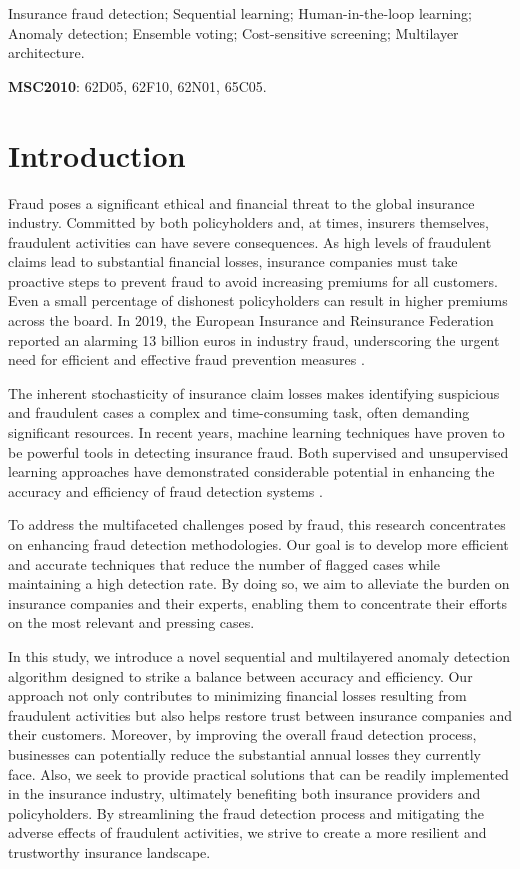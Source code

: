 \documentclass[12pt]{article}
\begin{document}
 Insurance fraud detection; Sequential learning;
Human-in-the-loop learning; Anomaly detection; Ensemble voting;
Cost-sensitive screening; Multilayer architecture.

{\bf MSC2010}: {62D05, 62F10, 62N01, 65C05.}

\section{Introduction}

Fraud poses a significant ethical and financial threat to the
global insurance industry. Committed by both policyholders and, at
times, insurers themselves, fraudulent activities can have severe
consequences. As high levels of fraudulent claims lead to
substantial financial losses, insurance companies must take
proactive steps to prevent fraud to avoid increasing premiums for
all customers. Even a small percentage of dishonest policyholders
can result in higher premiums across the board. In 2019, the
European Insurance and Reinsurance Federation reported an alarming
13 billion euros in industry fraud, underscoring the urgent need
for efficient and effective fraud prevention measures \cite{A61}.

The inherent stochasticity of insurance claim losses makes
identifying suspicious and fraudulent cases a complex and
time-consuming task, often demanding significant resources. In recent years, machine learning techniques have
proven to be powerful tools in detecting insurance fraud. Both
supervised and unsupervised learning approaches have demonstrated
considerable potential in enhancing the accuracy and efficiency of
fraud detection systems \cite{A61}.



To address the multifaceted challenges posed by fraud, this
research concentrates on enhancing fraud detection methodologies.
Our goal is to develop more efficient and accurate techniques that
reduce the number of flagged cases while maintaining a high
detection rate. By doing so, we aim to alleviate the burden on
insurance companies and their experts, enabling them to
concentrate their efforts on the most relevant and pressing cases.

In this study, we introduce a novel sequential and multilayered
anomaly detection algorithm designed to strike a balance between
accuracy and efficiency. Our approach not only contributes to
minimizing financial losses resulting from fraudulent activities
but also helps restore trust between insurance companies and their
customers. Moreover, by improving the overall fraud detection
process, businesses can potentially reduce the substantial annual
losses they currently face. Also, we seek to provide practical
solutions that can be readily implemented in the insurance
industry, ultimately benefiting both insurance providers and
policyholders. By streamlining the fraud detection process and
mitigating the adverse effects of fraudulent activities, we strive
to create a more resilient and trustworthy insurance landscape.
\end{document}
